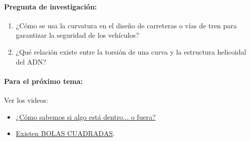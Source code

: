 \documentclass[a4,11pt]{aleph-notas}
\begin{document}
\paragraph{Pregunta de investigación:}
\begin{enumerate}[leftmargin=*]
    \item ¿Cómo se usa la curvatura en el diseño de carreteras o vías de tren para garantizar la seguridad de los vehículos?
    \item ¿Qué relación existe entre la torsión de una curva y la estructura helicoidal del ADN?
\end{enumerate}

\paragraph{Para el próximo tema:}  
 Ver los videos:
\begin{itemize}[leftmargin=*]
    \item \href{https://youtu.be/OaLD6idwXBc?si=GhjqGT12JOkhIztb}{¿Cómo sabemos si algo está dentro... o fuera?}
    \item \href{https://youtu.be/MgEp4Gb9TCA?si=rBe-cqnWIYNkJO_R}{Existen BOLAS CUADRADAS}.
\end{itemize} 
\end{document}
